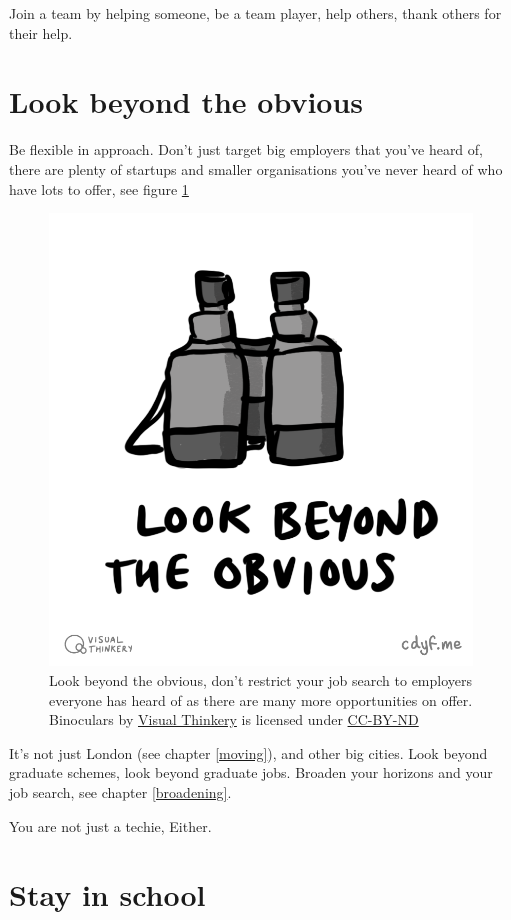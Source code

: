 \documentclass[
]{book}
\begin{document}
Join a team by helping someone, be a team player, help others, thank others for their help.

\hypertarget{beyond}{%
\section{Look beyond the obvious}\label{beyond}}

Be flexible in approach. Don't just target big employers that you've heard of, there are plenty of startups and smaller organisations you've never heard of who have lots to offer, see figure \ref{fig:binoculars-fig}

\begin{figure}

{\centering \includegraphics[width=0.5\linewidth]{images/Look beyond the obvious} 

}

\caption{Look beyond the obvious, don't restrict your job search to employers everyone has heard of as there are many more opportunities on offer. Binoculars by \href{https://visualthinkery.com}{Visual Thinkery} is licensed under \href{https://creativecommons.org/licenses/by-nd/4.0/}{CC-BY-ND}}\label{fig:binoculars-fig}
\end{figure}



It's not just London (see chapter \ref{moving}), and other big cities. Look beyond graduate schemes, look beyond graduate jobs. Broaden your horizons and your job search, see chapter \ref{broadening}.

You are not just a techie, Either.

\hypertarget{lifelonglearning}{%
\section{Stay in school}\label{lifelonglearning}}
\end{document}
